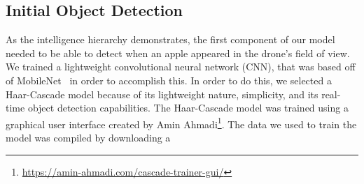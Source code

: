 \subsection{Initial Object Detection}
As the intelligence hierarchy demonstrates, the first component of our model needed to be able to detect when an apple appeared in the drone's field of view. 
We trained a lightweight convolutional neural network (CNN), that was based off of MobileNet~\cite{Sandler2018,PyTorchMobileNet} in order to accomplish this. 
In order to do this, we selected a Haar-Cascade model because of its lightweight nature, simplicity, and its real-time object detection capabilities. The Haar-Cascade model was trained using a graphical user interface created by Amin Ahmadi\footnote{\url{https://amin-ahmadi.com/cascade-trainer-gui/}}. The data we used to train the model was compiled by downloading a